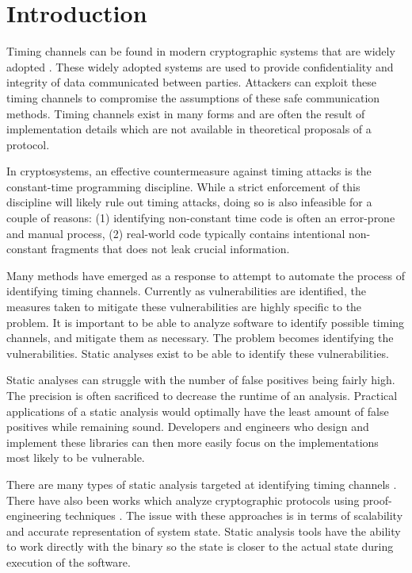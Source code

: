\section{Introduction}

Timing channels can be found in modern cryptographic systems that are widely
adopted \cite{kochertiming,brumley2005remote,percival2005cache,bernstein2017sliding}.
These widely adopted systems are used to provide confidentiality and integrity
of data communicated between parties. Attackers can exploit these timing
channels to compromise the assumptions of these safe communication methods.
Timing channels exist in many forms and are often the result of implementation
details which are not available in theoretical proposals of a protocol.

In cryptosystems, an effective countermeasure against timing attacks is the
constant-time programming discipline.  While a strict enforcement of this
discipline will likely rule out timing attacks, doing so is also infeasible for
a couple of reasons: (1) identifying non-constant time code  is often an
error-prone and manual process, (2) real-world code typically contains
intentional non-constant fragments that does not leak crucial information.

Many methods have emerged as a response to attempt to automate the process of
identifying timing channels. Currently as vulnerabilities are
identified, the measures taken to mitigate these vulnerabilities are highly
specific to the problem. It is important to be able to analyze software to
identify possible timing channels, and mitigate them as necessary. The problem
becomes identifying the vulnerabilities. Static analyses exist to be able to
identify these vulnerabilities.
  
  Static analyses can struggle with the number of false positives being fairly
  high. The precision is often sacrificed to decrease the runtime of an
  analysis. Practical applications of a static analysis would optimally have the
  least amount of false positives while remaining sound. Developers and
  engineers who design and implement these libraries can then more easily focus
  on the implementations most likely to be vulnerable.
  
  There are many types of static analysis targeted at identifying timing
  channels \cite{cached-zhang, brotzmancasym, molnar2005program}. There have also been
  works which analyze cryptographic protocols using proof-engineering techniques
  \cite{proof-engineering}. The issue with these approaches is in terms of
  scalability and accurate representation of system state. Static analysis tools
  have the ability to work directly with the binary so the state is closer to
  the actual state during execution of the software.

